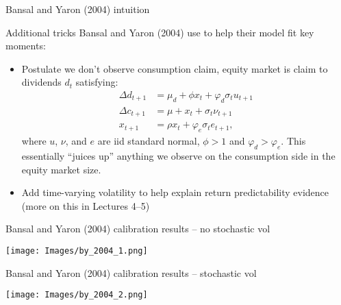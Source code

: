 \documentclass[xcolor=table, aspectratio=169]{beamer}
\begin{document}
\begin{frame}{Bansal and Yaron (2004) intuition}

Additional tricks Bansal and Yaron (2004) use to help their model fit key moments:
\begin{itemize}
\item Postulate we don't observe consumption claim, equity market is claim to dividends $d_t$ satisfying:
\begin{align*}
\Delta d_{t+1} &= \mu_d + \phi x_t + \varphi_d \sigma_t u_{t+1} \\
\Delta c_{t+1} &= \mu + x_t + \sigma_t \nu_{t+1}\\
x_{t+1} &= \rho x_t + \varphi_e \sigma_t e_{t+1},
\end{align*}
where $u$, $\nu$, and $e$ are iid standard normal, $\phi>1$ and $\varphi_d > \varphi_e$. This essentially ``juices up'' anything we observe on the consumption side in the equity market size.
\item Add time-varying volatility to help explain return predictability evidence (more on this in Lectures 4--5)
\end{itemize}

\end{frame}

\begin{frame}{Bansal and Yaron (2004) calibration results -- no stochastic vol}
\begin{center}
\texttt{[image: Images/by\_2004\_1.png]}
\end{center}
\end{frame}

\begin{frame}{Bansal and Yaron (2004) calibration results -- stochastic vol}
\begin{center}
\texttt{[image: Images/by\_2004\_2.png]}
\end{center}
\end{frame}
\end{document}
